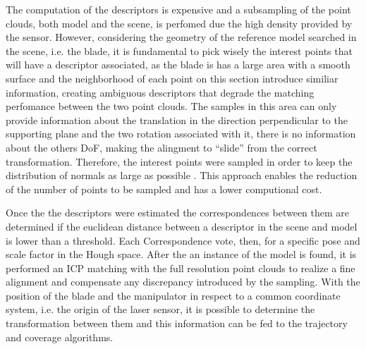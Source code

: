 The computation of the descriptors is expensive and a subsampling of the point
clouds, both model and the scene, is perfomed due the high density provided by
the sensor. However, considering the geometry of the reference model searched
in the scene, i.e. the blade, it is fundamental to pick wisely the interest
points that will have a descriptor associated, as the blade is has a large area
with a smooth surface and the neighborhood of each point on this section
introduce similiar information, creating ambiguous descriptors that degrade the
matching perfomance between the two point clouds.
The samples in this area can only provide information about the translation in
the direction perpendicular to the supporting plane and the two rotation
associated with it, there is no information about the others DoF, making the
alingment to ``slide'' from the correct transformation. Therefore, the interest
points were sampled in order to keep the distribution of normals as large as
possible \cite{Rusinkiewicz2001}. This approach enables the reduction of the
number of points to be sampled and has a lower computional cost.

Once the the descriptors were estimated the correspondences between them are
determined if the euclidean distance between a descriptor in the scene and model
is lower than a threshold. Each Correspondence vote, then, for a specific pose
and scale factor in the Hough space. After the an instance of the model is
found, it is performed an ICP matching with the full resolution point clouds to
realize a fine alignment and compensate any discrepancy introduced by the
sampling. With the position of the blade and the manipulator in respect to a
common coordinate system, i.e. the origin of the laser sensor, it is possible to
determine the transformation between them and this information can be fed to the
trajectory and coverage algorithms.




